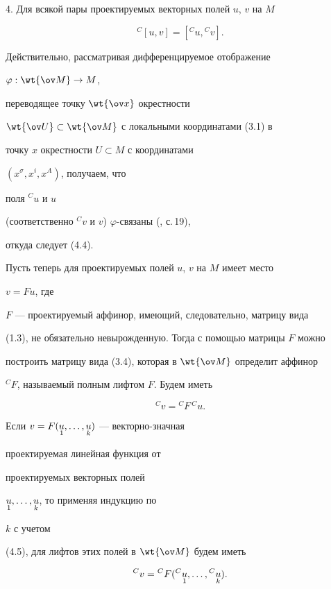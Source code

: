4. Для всякой пары проектируемых векторных полей $u$, $v$ на $M$


\begin{equation}


{}^C[u,v]=[{}^C u,{}^C v].


\end{equation}


Действительно, рассматривая дифференцируемое отображение


$\varphi:\wt{\ov M}\to M$,


переводящее точку $\wt{\ov x}$ окрестности


$\wt{\ov U}\subset\wt{\ov M}$ с локальными координатами (3.1) в


точку $x$ окрестности $U\subset M$ с координатами


$(x^\sigma,x^i,x^A)$, получаем, что


поля ${}^C u$ и $u$


(соответственно ${}^C v$ и $v$) $\varphi$-связаны (\cite{2}, с.\,19),


откуда следует (4.4).





Пусть теперь для проектируемых полей $u$, $v$ на $M$ имеет место


$v=Fu$, где


$F$ --- проектируемый аффинор, имеющий, следовательно, матрицу вида


(1.3), не обязательно невырожденную. Тогда с помощью матрицы $F$ можно


построить матрицу вида (3.4), которая в $\wt{\ov M}$ определит аффинор


${}^C F$, называемый полным лифтом $F$. Будем иметь


\begin{equation}


{}^C v={}^C F\,{}^C u.


\end{equation}


Если $v=F(\underset{1}{u}{},\dotsc,\underset{k}{u}{})$ --- векторно-значная


проектируемая линейная функция от


проектируемых векторных полей


$\underset{1}{u}{},\dotsc,\underset{k}{u}{}$, то применяя индукцию по


$k$ с учетом


(4.5), для лифтов этих полей в $\wt{\ov M}$ будем иметь


\begin{equation}


{}^C v={}^C F({}^C\down{1}{u},\dotsc,{}^C\down{k}{u}).


\end{equation}


